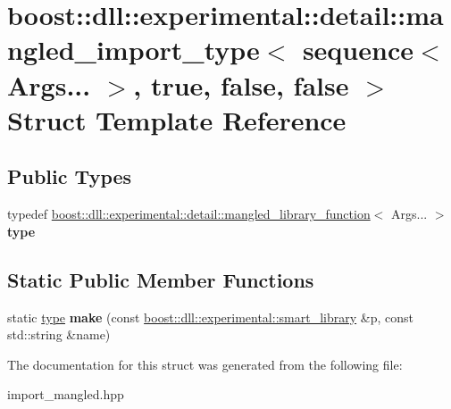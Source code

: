 \hypertarget{a01692}{}\section{boost\+:\+:dll\+:\+:experimental\+:\+:detail\+:\+:mangled\+\_\+import\+\_\+type$<$ sequence$<$ Args... $>$, true, false, false $>$ Struct Template Reference}
\label{a01692}
\subsection*{Public Types}
\begin{DoxyCompactItemize}
\item 
\mbox{\label{a01692_a92be3ca0d42eb637fe448e87f9f753e2}} 
typedef \hyperlink{a01668}{boost\+::dll\+::experimental\+::detail\+::mangled\+\_\+library\+\_\+function}$<$ Args... $>$ {\bfseries type}
\end{DoxyCompactItemize}
\subsection*{Static Public Member Functions}
\begin{DoxyCompactItemize}
\item 
\mbox{\label{a01692_ac9caaf62c6b7cd08646af5e8cf81335e}} 
static \hyperlink{a01668}{type} {\bfseries make} (const \hyperlink{a01712}{boost\+::dll\+::experimental\+::smart\+\_\+library} \&p, const std\+::string \&name)
\end{DoxyCompactItemize}


The documentation for this struct was generated from the following file\+:\begin{DoxyCompactItemize}
\item 
import\+\_\+mangled.\+hpp\end{DoxyCompactItemize}
